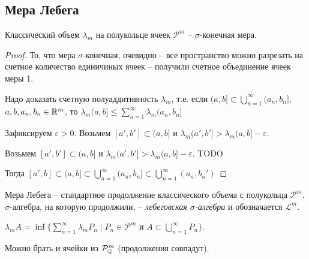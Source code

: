 \subsection{Мера Лебега}

\begin{theorem}
    Классический объем $\lambda_m$ на полукольце ячеек $\mathcal{P}^m$ – 
    $\sigma$-конечная мера.
\end{theorem}

\begin{proof}
    То, что мера $\sigma$-конечная, очевидно – все пространство можно разрезать на счетное количество единичиных ячеек –
    получили счетное объединение ячеек меры 1.

    Надо доказать счетную полуаддитивность $\lambda_m$, т.е. если 
    $(a, b]\subset \bigcup\limits_{n=1}^\infty (a_n, b_n]$, $a, b, a_n, b_n\in \mathbb{R}^m$, то 
    $\lambda_m (a, b]\leq \sum\limits_{n=1}^\infty \lambda_m (a_n, b_n]$

    Зафиксируем $\varepsilon > 0$. Возьмем $[a', b']\subset (a, b]$ и $\lambda_m (a', b']>\lambda_m (a, b]-\varepsilon$.

    Возьмем $[a', b']\subset (a, b]$ и $\lambda_m (a', b']>\lambda_m (a, b]-\varepsilon$. TODO

    Тогда $[a', b]\subset (a, b]\subset \bigcup\limits_{n=1}^\infty (a_n, b_n] \subset \bigcup\limits_{n=1}^\infty (a_n, b_n')$
\end{proof}

\begin{definition}
    Мера Лебега – стандартное продолжение классического объема с полукольца 
    $\mathcal{P}^m$. $\sigma$-алгебра, на которую продолжили, – \textit{лебеговская $\sigma$-алгебра}
    и обозначается $\mathcal{L}^m$.
\end{definition}

\begin{remark}
    $\lambda_m A = \inf \{\sum\limits_{n=1}^\infty \lambda_m P_n \mid P_n\in \mathcal{P}^m\text{ и } A\subset \bigcup\limits_{n=1}^\infty P_n \}$.

    Можно брать и ячейки из $\mathcal{P}^m_{\mathbb{Q}}$ (продолжения совпадут).
\end{remark}

